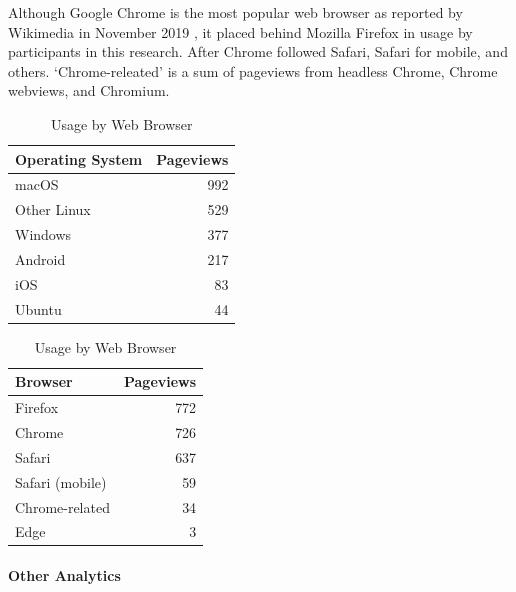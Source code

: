 \documentclass{article}
\begin{document}
Although Google Chrome is the most popular web browser as reported by Wikimedia in November 2019 \cite{noauthor_dashiki:_nodate}, it placed behind Mozilla Firefox in usage by participants in this research. After Chrome followed Safari, Safari for mobile, and others. `Chrome-releated' is a sum of pageviews from headless Chrome, Chrome webviews, and Chromium.

\begin{table}[!htb]
	\begin{minipage}{.5\linewidth}
		\caption{Usage by Operating System}
		\centering
		\begin{tabular}{lr}
			\hline
			\textbf{Operating System} & \textbf{Pageviews} \\
			\hline
			macOS                     & 992                \\
			Other Linux               & 529                \\
			Windows                   & 377                \\
			Android                   & 217                \\
			iOS                       & 83                 \\
			Ubuntu                    & 44                 \\
			\hline
		\end{tabular}
	\end{minipage}%
	\hspace{.1cm}
	\begin{minipage}{.5\linewidth}
		\centering
		\caption{Usage by Web Browser}
		\begin{tabular}{lr}
			\hline
			\textbf{Browser} & \textbf{Pageviews} \\
			\hline
			Firefox          & 772                \\
			Chrome           & 726                \\
			Safari           & 637                \\
			Safari (mobile)  & 59                 \\
			Chrome-related   & 34                 \\
			Edge             & 3                  \\
			\hline
		\end{tabular}
	\end{minipage} 
\end{table}

\paragraph{Other Analytics}
\end{document}
